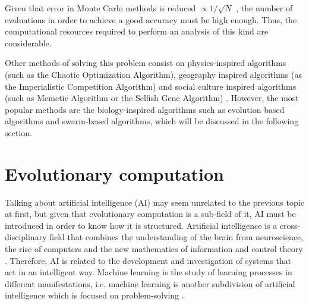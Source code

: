     Given that error in Monte Carlo methods is reduced $\propto 1/\sqrt{N}$ \cite{caflisch1998monte}, the number of evaluations in order to achieve a good accuracy must be high enough. Thus, the computational resources required to perform an analysis of this kind are considerable.
    
    Other methods of solving this problem consist on physics-inspired algorithms (such as the Chaotic Optimization Algorithm), geography inspired algorithms (as the Imperialistic Competition Algorithm) and social culture inspired algorithms (such as  Memetic Algorithm or the Selfish Gene Algorithm) \cite{cui2017multi}. However, the most popular methods are the biology-inspired algorithms such as evolution based algorithms and swarm-based algorithms, which will be discussed in the following section.

\newpage

\section{Evolutionary computation}

    Talking about artificial intelligence (AI) may seem unrelated to the previous topic at first, but given that evolutionary computation is a sub-field of it, AI must be introduced in order to know how it is structured. Artificial intelligence is a cross-disciplinary field that combines the understanding of the brain from neuroscience, the rise of computers and the new mathematics of information and control theory \cite{cleverAlgorithms}. Therefore, AI is related to the development and investigation of systems that act in an intelligent way. Machine learning is the study of learning processes in different manifestations, i.e. machine learning is another subdivision of artificial intelligence which is focused on problem-solving \cite{michalski2013machine}.
    
